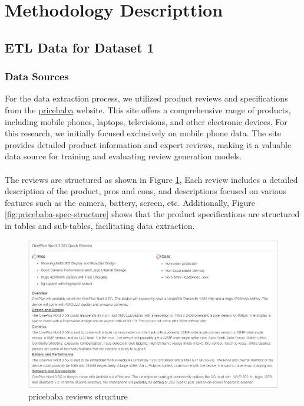 \section{Methodology Descripttion}
\subsection{ETL Data for Dataset 1}
\subsubsection{Data Sources}
For the data extraction process, we utilized product reviews and specifications from the \href{https://pricebaba.com/}{pricebaba} website. This site offers a comprehensive range of products, including mobile phones, laptops, televisions, and other electronic devices. For this research, we initially focused exclusively on mobile phone data. The site provides detailed product information and expert reviews, making it a valuable data source for training and evaluating review generation models.
\\\\
The reviews are structured as shown in Figure \ref{fig:pricebaba-review-structure}, Each review includes a detailed description of the product, pros and cons, and descriptions focused on various features such as the camera, battery, screen, etc. Additionally, Figure \ref{fig:pricebaba-spec-structure} shows that the product specifications are structured in tables and sub-tables, facilitating data extraction.
\begin{figure}[H]
    \centering
    \includegraphics[width=12cm]{images/pricebaba_review_structure.png}
    \caption{pricebaba reviews structure \cite{OnePlusNord35G2023}}
    \label{fig:pricebaba-review-structure}
\end{figure}
